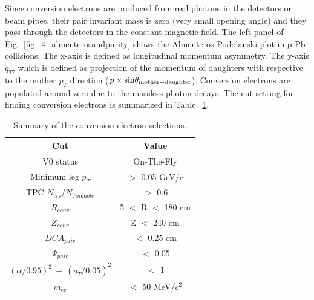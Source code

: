 {{Since conversion electrons are produced from real photons in the detectors or beam pipes, their pair invariant mass is zero (very small opening angle) and they pass through the detectors in the constant magnetic field.  
The left panel of Fig.~\ref{fig_4_almenterosandpurity} shows the Almenteros-Podolanski plot in p-Pb collisions.
The x-axis is defined as longitudinal momentum asymmetry. 
The y-axis $q_{T}$, which is defined as projection of the momentum of daughters with respective to the mother $p_{T}$ direction ($\it{p}\times \rm{sin}\theta_{\rm{mother-daughter}}$). 
Conversion electrons are populated around zero due to the massless photon decays.  
The cut setting for finding conversion electrons is summarized in Table.~\ref{table_convcut}.
\begin{table}[!h]
  \centering
  \begin{tabular}{cc} \hline
    Cut  & Value \\ \hline
    V0 status  & On-The-Fly \\ 
    Minimum leg $p_{T}$  & $>$ 0.05 GeV/c \\ 
    TPC $N_{cls}$/$N_{findable}$ & $>$ 0.6 \\ 
    $R_{conv}$  & 5 $<$ R $<$ 180 cm \\
    $Z_{conv}$  & Z $<$ 240 cm \\ 
    $DCA_{pair}$  & $<$ 0.25 cm\\ 
    $\Psi_{pair}$  & $<$ 0.05 \\ 
    $(\alpha/0.95)^{2}~+~(q_{T}/0.05)^{2}$  & $<$ 1 \\ 
    $m_{ee}$  & $<$ 50 MeV/$c^{2}$ \\ \hline
  \end{tabular}  
  \label{table_convcut}
  \caption{Summary of the conversion electron selections. }
\end{table}

}}
